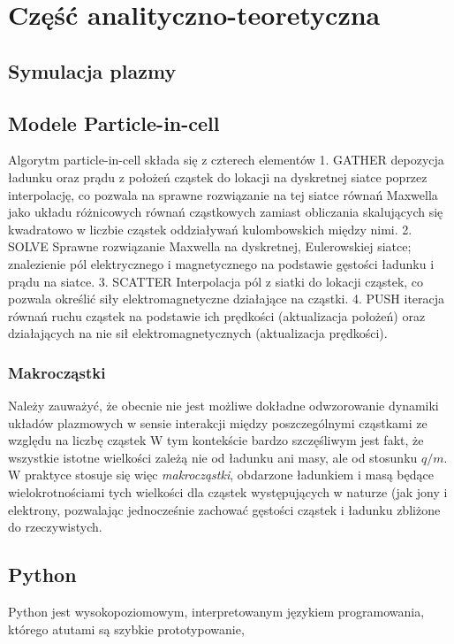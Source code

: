 \section{Część analityczno-teoretyczna} %
\subsection{Symulacja plazmy}
\subsection{Modele Particle-in-cell}

Algorytm particle-in-cell składa się z czterech elementów %
1. GATHER
depozycja ładunku oraz prądu z położeń cząstek do lokacji na dyskretnej siatce poprzez interpolację,
co pozwala na sprawne rozwiązanie na tej siatce
równań Maxwella jako układu różnicowych równań cząstkowych zamiast obliczania skalujących się kwadratowo w liczbie cząstek
oddziaływań kulombowskich między nimi.
2. SOLVE
Sprawne rozwiązanie Maxwella na dyskretnej, Eulerowskiej siatce; znalezienie pól elektrycznego i magnetycznego
na podstawie gęstości ładunku i prądu na siatce. 
3. SCATTER
Interpolacja pól z siatki do lokacji cząstek, co pozwala określić siły elektromagnetyczne działające na cząstki.
4. PUSH
iteracja równań ruchu cząstek na podstawie ich prędkości (aktualizacja położeń)
oraz działających na nie sił elektromagnetycznych (aktualizacja prędkości).

\subsubsection{Makrocząstki}
Należy zauważyć, że obecnie nie jest możliwe dokładne odwzorowanie dynamiki układów plazmowych w sensie interakcji
między poszczególnymi cząstkami ze względu na liczbę cząstek %
W tym kontekście bardzo szczęśliwym jest fakt, że wszystkie istotne wielkości zależą nie od ładunku ani masy,
ale od stosunku $q/m$. W praktyce stosuje się więc \emph{makrocząstki}, obdarzone ładunkiem i masą będące wielokrotnościami
tych wielkości dla cząstek występujących w naturze (jak jony i elektrony, pozwalając jednocześnie zachować gęstości
cząstek i ładunku %
zbliżone do rzeczywistych.

\subsection{Python}
Python jest wysokopoziomowym, interpretowanym językiem programowania, którego atutami są szybkie prototypowanie,

